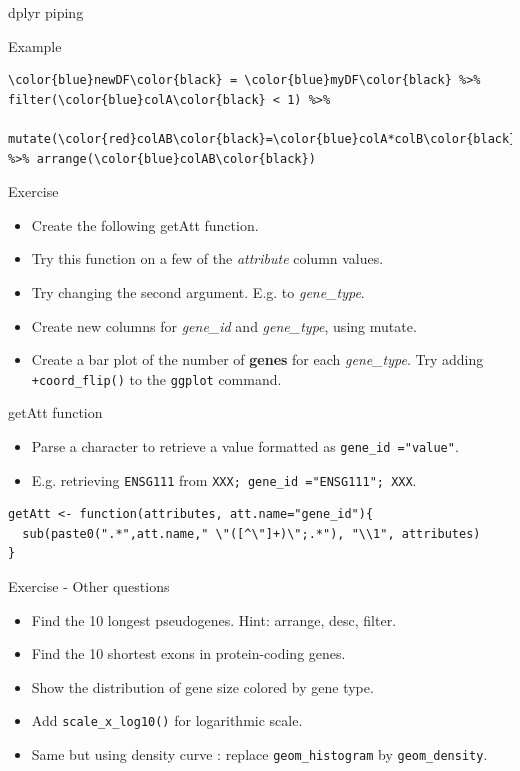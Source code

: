\documentclass[10pt]{beamer}
\begin{document}
\begin{frame}[fragile, shrink=10]{{\sf dplyr} piping}
  \begin{exampleblock}{Example}
\begin{Verbatim}[commandchars=\\\{\}]
\color{blue}newDF\color{black} = \color{blue}myDF\color{black} %>% filter(\color{blue}colA\color{black} < 1) %>% 
             mutate(\color{red}colAB\color{black}=\color{blue}colA*colB\color{black}) %>% arrange(\color{blue}colAB\color{black})
\end{Verbatim}
  \end{exampleblock}
  \begin{alertblock}{Exercise}
    \begin{itemize}
    \item Create the following {\sf getAtt} function.
    \item Try this function on a few of the {\it attribute} column values.
    \item Try changing the second argument. E.g. to {\it gene\_type}.
    \item Create new columns for {\it gene\_id} and {\it gene\_type}, using {\sf mutate}.
    \item Create a bar plot of the number of {\bf genes} for each {\it gene\_type}. Try adding \verb!+coord_flip()! to the \verb!ggplot! command.
    \end{itemize}
  \end{alertblock}
  \begin{block}{{\sf getAtt} function}
    \begin{itemize}
    \item Parse a character to retrieve a value formatted as \verb!gene_id ="value"!.
    \item E.g. retrieving \color{red}\verb!ENSG111! \color{black} from \color{blue}\verb!XXX; gene_id ="ENSG111"; XXX!.
    \end{itemize}

\begin{verbatim}
getAtt <- function(attributes, att.name="gene_id"){
  sub(paste0(".*",att.name," \"([^\"]+)\";.*"), "\\1", attributes)
}  
\end{verbatim}    
  \end{block}
\end{frame}

\begin{frame}[fragile]{Exercise - Other questions}
  \begin{itemize}
  \item Find the 10 longest pseudogenes. {\tiny Hint: arrange, desc, filter.}
  \item Find the 10 shortest exons in protein-coding genes.
    \bigskip
  \item Show the distribution of gene size colored by gene type.
  \item Add \verb!scale_x_log10()! for logarithmic scale.
    \bigskip
  \item Same but using density curve : replace \verb!geom_histogram! by \verb!geom_density!.
  \end{itemize}
\end{frame}
\end{document}
